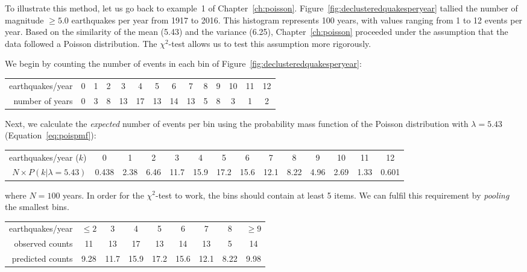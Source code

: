 To illustrate this method, let us go back to example~1 of
Chapter~\ref{ch:poisson}. Figure~\ref{fig:declusteredquakesperyear}
tallied the number of magnitude $\geq{5.0}$ earthquakes per year from
1917 to 2016.  This histogram represents 100 years, with values
ranging from 1 to 12 events per year. Based on the similarity of the
mean (5.43) and the variance (6.25), Chapter~\ref{ch:poisson}
proceeded under the assumption that the data followed a Poisson
distribution.  The $\chi^2$-test allows us to test this assumption
more rigorously.\medskip

We begin by counting the number of events in each bin of
Figure~\ref{fig:declusteredquakesperyear}:

\begin{center}
  \begin{tabular}{r|c@{\gap}c@{\gap}c@{\gap}c@{\gap}c@{\gap}
      c@{\gap}c@{\gap}c@{\gap}c@{\gap}c@{\gap}c@{\gap}c@{\gap}c}
    earthquakes/year &
    0 & 1 & 2 & 3 & 4 & 5 & 6 & 7 & 8 & 9 & 10 & 11 & 12 \\
    number of years &
    0 & 3 & 8 & 13 & 17 & 13 & 14 & 13 & 5 & 8 & 3 & 1 & 2 
  \end{tabular}
\end{center}

Next, we calculate the \textit{expected} number of events per bin
using the probability mass function of the Poisson distribution with
$\lambda=5.43$ (Equation~\ref{eq:poispmf}):

\begin{center}
  \begin{tabular}{r|c@{\gap}c@{\gap}c@{\gap}c@{\gap}c@{\gap}
      c@{\gap}c@{\gap}c@{\gap}c@{\gap}c@{\gap}c@{\gap}c@{\gap}c}
    earthquakes/year ($k$) &
    0 & 1 & 2 & 3 & 4 & 5 & 6 & 7 & 8 & 9 & 10 & 11 & 12 \\
    $N\times{P}(k|\lambda=5.43)$ &
    0.438 & 2.38 & 6.46 & 11.7 & 15.9 & 17.2 & 15.6 & 12.1 &
    8.22 & 4.96 & 2.69 & 1.33 & 0.601
  \end{tabular}
\end{center}

\noindent where $N=100$ years. In order for the $\chi^2$-test to work,
the bins should contain at least 5 items. We can fulfil this
requirement by \emph{pooling} the smallest bins.

\begin{center}
  \begin{tabular}{r|c@{\gap}c@{\gap}c@{\gap}
      c@{\gap}c@{\gap}c@{\gap}c@{\gap}c}
    earthquakes/year &
    $\leq{2}$ & 3 & 4 & 5 & 6 & 7 & 8 & $\geq{9}$ \\
    observed counts &
    11 & 13 & 17 & 13 & 14 & 13 & 5 & 14 \\
    predicted counts & 9.28 & 11.7 &
    15.9 & 17.2 & 15.6 & 12.1 & 8.22 & 9.98
  \end{tabular}
\end{center}

